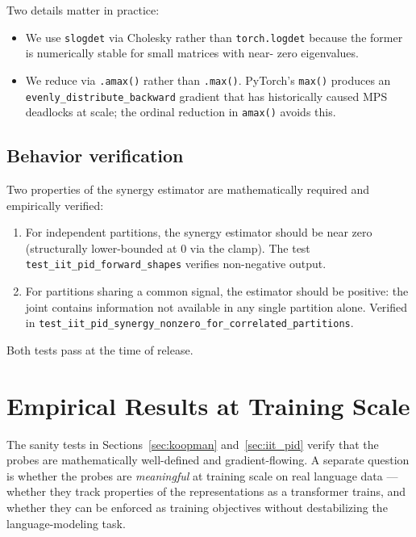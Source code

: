 \documentclass[11pt]{article}
\begin{document}
Two details matter in practice:

\begin{itemize}
\item We use \texttt{slogdet} via Cholesky rather than \texttt{torch.logdet}
because the former is numerically stable for small matrices with near-
zero eigenvalues.
\item We reduce via \texttt{.amax()} rather than \texttt{.max()}.
PyTorch's \texttt{max()} produces an \texttt{evenly\_distribute\_backward}
gradient that has historically caused MPS deadlocks at scale; the
ordinal reduction in \texttt{amax()} avoids this.
\end{itemize}

\subsection{Behavior verification}

Two properties of the synergy estimator are mathematically required and
empirically verified:

\begin{enumerate}
\item For independent partitions, the synergy estimator should be near zero
(structurally lower-bounded at $0$ via the clamp). The test
\texttt{test\_iit\_pid\_forward\_shapes} verifies non-negative output.
\item For partitions sharing a common signal, the estimator should be
positive: the joint contains information not available in any single
partition alone. Verified in
\texttt{test\_iit\_pid\_synergy\_nonzero\_for\_correlated\_partitions}.
\end{enumerate}

Both tests pass at the time of release.

\section{Empirical Results at Training Scale}
\label{sec:empirical}

The sanity tests in Sections~\ref{sec:koopman} and~\ref{sec:iit_pid}
verify that the probes are mathematically well-defined and gradient-flowing.
A separate question is whether the probes are \emph{meaningful} at training
scale on real language data --- whether they track properties of the
representations as a transformer trains, and whether they can be enforced
as training objectives without destabilizing the language-modeling task.
\end{document}
